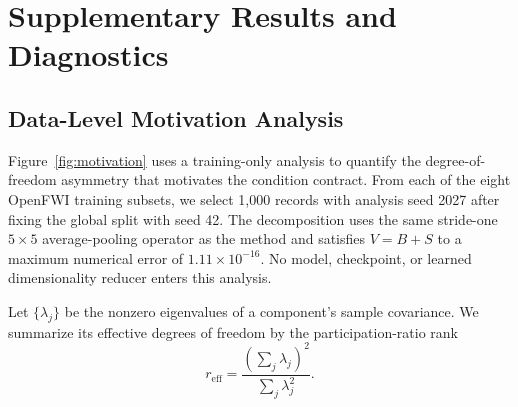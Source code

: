 \section{Supplementary Results and Diagnostics}
\label{app:supplementary-results}

\subsection{Data-Level Motivation Analysis}
Figure~\ref{fig:motivation} uses a training-only analysis to quantify the degree-of-freedom asymmetry that motivates the condition contract. From each of the eight OpenFWI training subsets, we select 1,000 records with analysis seed 2027 after fixing the global split with seed 42. The decomposition uses the same stride-one $5\times5$ average-pooling operator as the method and satisfies $V=B+S$ to a maximum numerical error of $1.11\times10^{-16}$. No model, checkpoint, or learned dimensionality reducer enters this analysis.

Let $\{\lambda_j\}$ be the nonzero eigenvalues of a component's sample covariance. We summarize its effective degrees of freedom by the participation-ratio rank
\begin{equation}
r_{\mathrm{eff}}=\frac{\left(\sum_j\lambda_j\right)^2}{\sum_j\lambda_j^2}.
\label{eq:effective-rank}
\end{equation}

